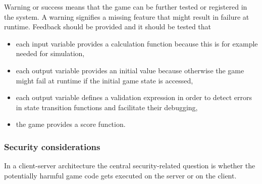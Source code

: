 Warning or success means that the game can be further tested or registered in the system. A warning signifies a missing feature that might result in failure at runtime. Feedback should be provided and it should be tested that
\begin{itemize}
\item each input variable provides a calculation function because this is for example needed for simulation,
\item each output variable provides an initial value because otherwise the game might fail at runtime if the initial game state is accessed, 
\item each output variable defines a validation expression in order to detect errors in state transition functions and facilitate their debugging, 
\item the game provides a score function.
\end{itemize}

\subsubsection{Security considerations}
\label{subsub:security}

In a client-server architecture the central security-related question is whether the potentially harmful game code gets executed on the server or on the client.

